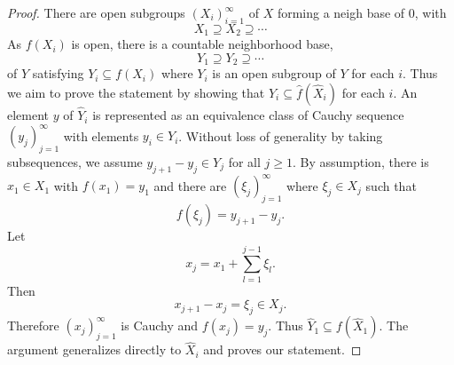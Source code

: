 \documentclass[10pt]{article}
\numberwithin{equation}{section}
\theoremstyle{definition}
\begin{document}
\begin{proof}
    There are open subgroups $(X_i)_{i=1}^\infty$ of $X$ forming a neigh
    base of $0$, with
    \begin{equation*}
        X_1\supseteq X_2\supseteq\cdots
    \end{equation*}
    As $f(X_i)$ is open, there is a countable neighborhood base,
    \begin{equation*}
    Y_1\supseteq Y_2\supseteq\cdots
    \end{equation*}
    of $Y$ satisfying $Y_i\subseteq f(X_i)$ where $Y_i$ is an open subgroup of $Y$ for each $i$. Thus we aim to prove the statement by showing
    that $\widehat{Y}_i\subseteq \widehat{f}(\widehat{X}_i)$ for each $i$. An element $y$ of $\widehat{Y}_i$ is represented as an equivalence class of Cauchy sequence $(y_j)_{j=1}^\infty$ with elements $y_i\in Y_i$. Without loss of generality by taking subsequences, we assume $y_{j+1}-y_j\in Y_j$
    for all $j\geq 1$. By assumption, there is $x_1\in X_1$ with $f(x_1) = y_1$ and there are $(\xi_j)_{j=1}^\infty$ where $\xi_j\in X_{j}$ such that
    \begin{equation*}
        f(\xi_j) = y_{j+1}-y_j.
    \end{equation*}
    Let
    \begin{equation*}
    x_j = x_1+\sum_{l=1}^{j-1}\xi_l.
    \end{equation*}
    Then
    \begin{equation*}
        x_{j+1}-x_j = \xi_j\in X_j.
    \end{equation*}
    Therefore $(x_j)_{j=1}^\infty$ is Cauchy and $f(x_j)=y_j$. Thus $\widehat{Y}_1\subseteq f(\widehat{X}_1)$. The argument generalizes directly to $\widehat{X}_i$ and proves our statement.
\end{proof}
\end{document}
